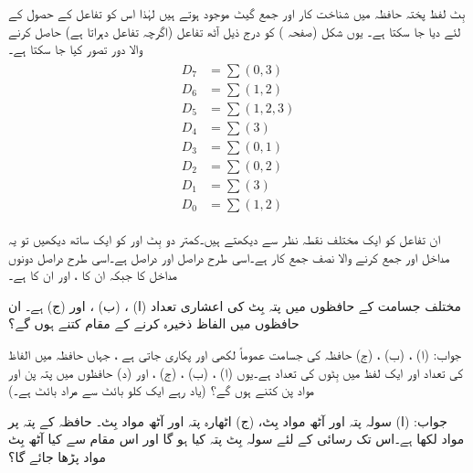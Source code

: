  بِٹ لفظ پختہ حافظہ میں شناخت کار اور  جمع گیٹ موجود ہوتے ہیں لہٰذا اس کو  تفاعل کے حصول کے لئے  دیا جا سکتا ہے۔ یوں شکل    (صفحہ ) کو درج ذیل آٹھ تفاعل (اگرچہ  تفاعل  دہراتا ہے) حاصل کرنے والا دور تصور کیا جا سکتا ہے۔
\begin{gather}
\begin{aligned}
D_7&=\sum (0,3)\\
D_6&=\sum(1,2)\\
D_5&=\sum (1,2,3)\\
D_4&=\sum(3)\\
D_3&=\sum(0,1)\\
D_2&=\sum (0,2)\\
D_1&=\sum(3)\\
D_0&=\sum(1,2)
\end{aligned}
\end{gather}

ان تفاعل کو ایک مختلف نقطہ نظر سے دیکھتے ہیں۔کمتر دو بِٹ  اور  کو ایک ساتھ  دیکھیں تو یہ مداخل  اور  جمع کرنے والا نصف جمع کار ہے۔اسی طرح  دراصل  اور  دراصل  ہے۔اسی طرح  دراصل دونوں مداخل کا  جبکہ  ان کا ،   اور  ان کا ہے۔

  مختلف جسامت کے حافظوں میں پتہ بِٹ  کی  اعشاری تعداد  (ا) ، (ب) ، اور  (ج)   ہے۔  ان حافظوں میں الفاظ ذخیرہ کرنے کے  مقام کتنے  ہوں گے؟
  
  جواب: (ا)  ، (ب) ، (ج) 
 حافظہ کی  جسامت  عموماً  لکھی اور پکاری جاتی ہے ، جہاں   حافظہ میں الفاظ کی تعداد اور  ایک لفظ میں بِٹوں کی تعداد  ہے۔یوں  (ا) ،  (ب)   ، (ج)  ، اور (د)     حافظوں میں پتہ پن  اور  مواد پن کتنے  ہوں گے؟ (یاد رہے  ایک کلو بائٹ سے مراد    بائٹ ہے۔)
 
 جواب: (ا)    سولہ  پتہ اور  آٹھ مواد بِٹ، (ج)  اٹھارہ پتہ اور آٹھ مواد بِٹ۔
 حافظہ کے   پتہ  پر  مواد لکھا ہے۔اس تک رسائی کے لئے سولہ بِٹ  پتہ کیا ہو گا اور اس  مقام سے کیا  آٹھ  بِٹ مواد  پڑھا جائے گا؟
 

